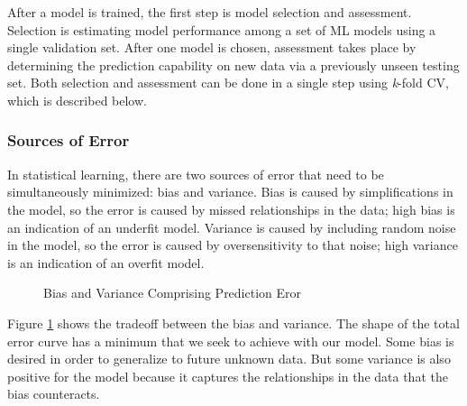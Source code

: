 After a model is trained, the first step is model selection and assessment.
Selection is estimating model performance among a set of \gls{ML} models using
a single validation set.  After one model is chosen, assessment takes place by
determining the prediction capability on new data via a previously unseen
testing set. Both selection and assessment can be done in a single step using
\textit{k}-fold \gls{CV}, which is described below.

\subsubsection{Sources of Error} 

In statistical learning, there are two sources of error that need to be
simultaneously minimized: bias and variance. Bias is caused by simplifications
in the model, so the error is caused by missed relationships in the data; high
bias is an indication of an underfit model.  Variance is caused by including
random noise in the model, so the error is caused by oversensitivity to that
noise; high variance is an indication of an overfit model. 

\begin{figure}[!htb]
  \caption{Bias and Variance Comprising Prediction Eror}
  \label{fig:bvtradeoff}
\end{figure}

Figure \ref{fig:bvtradeoff} shows the tradeoff between the bias and variance.
The shape of the total error curve has a minimum that we seek to achieve with
our model. Some bias is desired in order to generalize to future unknown data.
But some variance is also positive for the model because it captures the
relationships in the data that the bias counteracts. 

